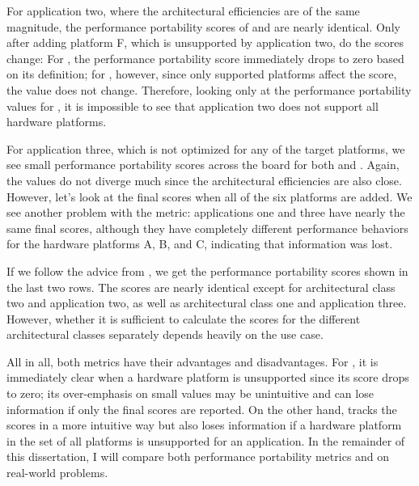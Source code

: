 For application two, where the architectural efficiencies are of the same magnitude, the performance portability scores of \pp and \mpp are nearly identical. 
Only after adding platform F, which is unsupported by application two, do the scores change: For \pp, the performance portability score immediately drops to zero based on its definition; for \mpp, however, since only supported platforms affect the \mpp score, the value does not change. 
Therefore, looking only at the performance portability values for \mpp, it is impossible to see that application two does not support all hardware platforms. 

For application three, which is not optimized for any of the target platforms, we see small performance portability scores across the board for both \pp and \mpp. 
Again, the values do not diverge much since the architectural efficiencies are also close. 
However, let's look at the final scores when all of the six platforms are added. 
We see another problem with the \pp metric: applications one and three have nearly the same final scores, although they have completely different performance behaviors for the hardware platforms A, B, and C, indicating that information was lost. 

If we follow the advice from \citet{marowka_toward_2021}, we get the performance portability scores shown in the last two rows. 
The scores are nearly identical except for architectural class two and application two, as well as architectural class one and application three. 
However, whether it is sufficient to calculate the scores for the different architectural classes separately depends heavily on the use case. 

All in all, both metrics have their advantages and disadvantages. 
For \pp, it is immediately clear when a hardware platform is unsupported since its score drops to zero; its over-emphasis on small values may be unintuitive and can lose information if only the final scores are reported. 
On the other hand, \mpp tracks the scores in a more intuitive way but also loses information if a hardware platform in the set of all platforms is unsupported for an application. 
In the remainder of this dissertation, I will compare both performance portability metrics \pp and \mpp on real-world problems.
